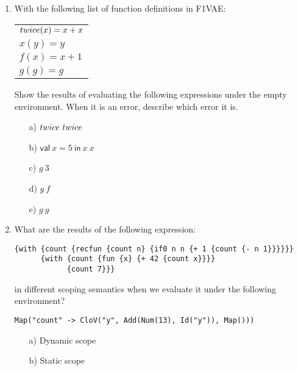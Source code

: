 \begin{enumerate}
\item With the following list of function definitions in F1VAE:

\begin{tabular}{l}
\(twice(x) = x + x\) \\
\( x(y) = y\) \\
\( f(x) = x + 1\) \\
\( g(g) = g\)
\end{tabular}

Show the results of evaluating the following expressions under the empty environment.
When it is an error, describe which error it is.
\begin{itemize}
  \item[a)] \(twice\ twice\)

  \item[b)] \(\textsf{val}\ x=5\ \textsf{in}\ x\ x\)

  \item[c)] \(g\ 3\)

  \item[d)] \(g\ f\)

  \item[e)] \(g\ g\)
\end{itemize}

\item What are the results of the following expression:
\begin{verbatim}
{with {count {recfun {count n} {if0 n n {+ 1 {count {- n 1}}}}}}
      {with {count {fun {x} {+ 42 {count x}}}}
            {count 7}}}
\end{verbatim}

in different scoping semantics when we evaluate it under the following environment?
\begin{verbatim}
Map("count" -> CloV("y", Add(Num(13), Id("y")), Map()))
\end{verbatim}

\begin{itemize}
  \item[a)] Dynamic scope
  \item[b)] Static scope
\end{itemize}


\end{enumerate}
